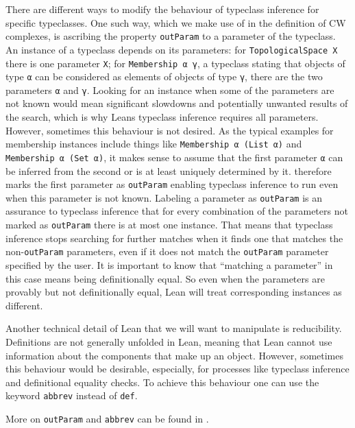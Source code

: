There are different ways to modify the behaviour of typeclass inference for specific typeclasses. 
One such way, which we make use of in the definition of CW complexes, is ascribing the property \lstinline|outParam| to a parameter of the typeclass. 
An instance of a typeclass depends on its parameters: for \lstinline|TopologicalSpace X| there is one parameter \lstinline|X|; for \lstinline|Membership α γ|, a typeclass stating that objects of type \lstinline|α| can be considered as elements of objects of type \lstinline|γ|, there are the two parameters \lstinline|α| and \lstinline|γ|.
Looking for an instance when some of the parameters are not known would mean significant slowdowns and potentially unwanted results of the search, which is why Leans typeclass inference requires all parameters. 
However, sometimes this behaviour is not desired. 
As the typical examples for membership instances include things like \lstinline|Membership α (List α)| and \lstinline|Membership α (Set α)|, it makes sense to assume that the first parameter \lstinline|α| can be inferred from the second or is at least uniquely determined by it. 
\mathlib therefore marks the first parameter as \lstinline|outParam| enabling typeclass inference to run even when this parameter is not known.
Labeling a parameter as \lstinline|outParam| is an assurance to typeclass inference that for every combination of the parameters not marked as \lstinline|outParam| there is at most one instance. 
That means that typeclass inference stops searching for further matches when it finds one that matches the non-\lstinline|outParam| parameters, even if it does not match the \lstinline|outParam| parameter specified by the user. 
It is important to know that ``matching a parameter'' in this case means being definitionally equal. 
So even when the parameters are provably but not definitionally equal, Lean will treat corresponding instances as different. 

Another technical detail of Lean that we will want to manipulate is reducibility.
Definitions are not generally unfolded in Lean, meaning that Lean cannot use information about the components that make up an object. 
However, sometimes this behaviour would be desirable, especially, for processes like typeclass inference and definitional equality checks. 
To achieve this behaviour one can use the keyword \lstinline|abbrev| instead of \lstinline|def|. 

More on \lstinline|outParam| and \lstinline|abbrev| can be found in \cite{LeanReference2025}.


